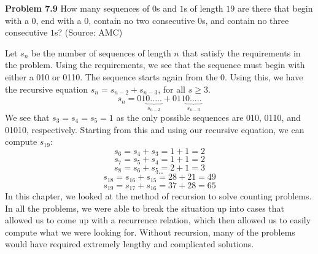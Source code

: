 \documentclass[11pt]{scrartcl}
\begin{document}
\begin{tcolorbox}
\textbf{Problem 7.9} How many sequences of $0$s and $1$s of length $19$ are there that begin with a $0$, end with a $0$, contain no two consecutive $0$s, and contain no three consecutive $1$s? (Source: AMC)
\end{tcolorbox}
\noindent 
Let $s_n$ be the number of sequences of length $n$ that satisfy the requirements in the problem. Using the requirements, we see that the sequence must begin with either a 010 or 0110. The sequence starts again from the 0. Using this, we have the recursive equation ${s_n}={s_{n-2}}+{s_{n-3}}$, for all $s \ge 3$. 
$${s_n}=01{\underbrace{0.....}_{s_{n-2}}}+011{\underbrace{0.....}_{s_{n-3}}}$$
We see that ${s_3}={s_4}={s_5}=1$ as the only possible sequences are 010, 0110, and 01010, respectively. Starting from this and using our recursive equation, we can compute $s_{19}$:
$${s_6}={s_4}+{s_3}=1+1=2$$
$${s_7}={s_5}+{s_4}=1+1=2$$
$${s_8}={s_6}+{s_5}=2+1=3$$
$$...$$
$${s_{18}}={s_{16}}+{s_{15}}=28+21=49$$
$${s_{19}}={s_{17}}+{s_{16}}=37+28=65$$
In this chapter, we looked at the method of recursion to solve counting problems. In all the problems, we were able to break the situation up into cases that allowed us to come up with a recurrence relation, which then allowed us to easily compute what we were looking for. Without recursion, many of the problems would have required extremely lengthy and complicated solutions. 
\end{document}
